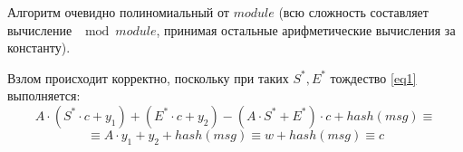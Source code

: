 \documentclass[a4paper, 14pt]{article}
\numberwithin{equation}{section}
\begin{document}
	Алгоритм очевидно полиномиальный от $module$ (всю сложность составляет вычисление $\mod{module}$, принимая остальные арифметические вычисления за константу).

	Взлом происходит корректно, поскольку при таких $S^*, E^*$ тождество \eqref{eq1} выполняется:
	\begin{equation*}
		A \cdot (S^*\cdot c + y_1) + (E^*\cdot c + y_2) - (A\cdot S^*  + E^*) \cdot c + hash(msg) \equiv
	\end{equation*}
	\begin{equation*}
		\equiv A\cdot y_1 + y_2 + hash(msg) \equiv w + hash(msg) \equiv c 
	\end{equation*}
\end{document}
